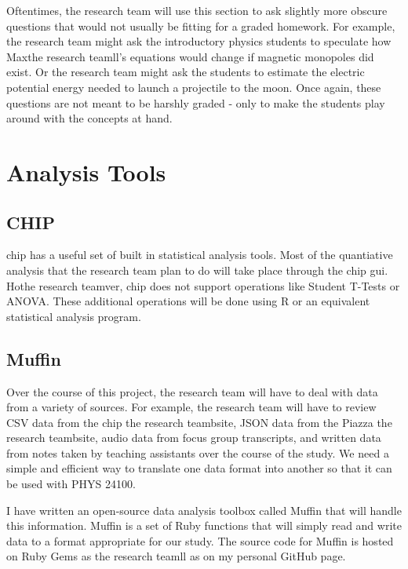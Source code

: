 Oftentimes, the research team will use this section to ask slightly more obscure questions that would not usually be fitting for a graded homework. For example, the research team might ask the introductory physics students to speculate how Maxthe research teamll's equations would change if magnetic monopoles did exist. Or the research team might ask the students to estimate the electric potential energy needed to launch a projectile to the moon. Once again, these questions are not meant to be harshly graded - only to make the students play around with the concepts at hand.

\section{Analysis Tools}

\subsection{CHIP}

\gls{chip} has a useful set of built in statistical analysis tools. Most of the quantiative analysis that the research team plan to do will take place through the \gls{chip} \gls{gui}. Hothe research teamver, \gls{chip} does not support operations like Student T-Tests or ANOVA. These additional operations will be done using R or an equivalent statistical analysis program.

\subsection{Muffin}

Over the course of this project, the research team will have to deal with data from a variety of sources. For example, the research team will have to review CSV data from the \gls{chip} the research teambsite, JSON data from the Piazza the research teambsite, audio data from focus group transcripts, and written data from notes taken by teaching assistants over the course of the study. We need a simple and efficient way to translate one data format into another so that it can be used with PHYS 24100.

I have written an open-source data analysis toolbox called Muffin that will handle this information. Muffin is a set of Ruby functions that will simply read and write data to a format appropriate for our study. The source code for Muffin is hosted on Ruby Gems as the research teamll as on my personal GitHub page.

